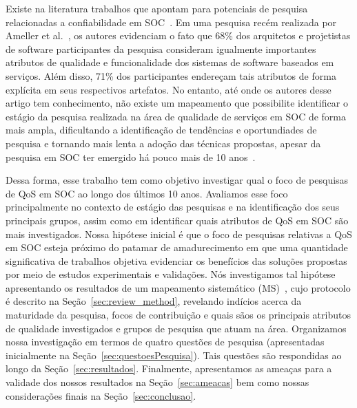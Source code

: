 Existe na literatura trabalhos que apontam para potenciais de pesquisa relacionadas a confiabilidade em SOC~\cite{4797931}. Em uma pesquisa rec\'{e}m realizada por Ameller et al.~\cite{Ameller2013-ECSA}, os autores evidenciam o fato que 68\% dos arquitetos e projetistas de software participantes da pesquisa consideram igualmente importantes atributos de qualidade e funcionalidade dos sistemas de software baseados em servi\c{c}os. Al\'{e}m disso, 71\% dos participantes endere\c{c}am tais atributos de forma expl\'{i}cita em seus respectivos artefatos. No entanto, at\'{e} onde os autores desse artigo tem conhecimento, n\~{a}o existe um mapeamento que possibilite identificar o est\'{a}gio da pesquisa realizada na \'{a}rea de qualidade de servi\c cos em SOC de forma mais ampla, dificultando a identifica\c c\~{a}o de tend\^{e}ncias e oportundiades de pesquisa e tornando mais lenta a ado\c c\~{a}o das t\'{e}cnicas propostas, apesar da pesquisa em SOC ter emergido h\'{a} pouco mais de 10 anos~\cite{papazoglou:cacm2003}.

Dessa forma, esse trabalho tem como objetivo investigar qual o foco de pesquisas de QoS em SOC ao longo dos \'{u}ltimos 10 anos. Avaliamos esse foco principalmente no contexto de est\'{a}gio das pesquisas e na identifica\c{c}\~{a}o dos seus principais grupos, assim como em identificar quais atributos de QoS em SOC s\~{a}o mais investigados. Nossa hip\'{o}tese inicial \'{e} que o foco de pesquisas relativas a QoS em SOC esteja próximo do patamar de amadurecimento em que uma quantidade significativa de trabalhos objetiva evidenciar os benef\'{i}cios das solu\c c\~{o}es propostas por meio de estudos experimentais e valida\c c\~{o}es. N\'{o}s investigamos tal hip\'{o}tese apresentando os resultados de um mapeamento sistem\'{a}tico (MS)~\cite{petersen:sms2008}, cujo protocolo \'{e} descrito na Seção~\ref{sec:review_method}, revelando indícios acerca da maturidade da pesquisa, focos de contribuição e quais s\~{a}os os principais atributos de qualidade investigados e grupos de pesquisa que atuam na \'{a}rea. 
Organizamos nossa investiga\c{c}\~{a}o em termos de quatro quest\~{o}es de pesquisa (apresentadas inicialmente na Seção~\ref{sec:questoesPesquisa}). Tais questões são respondidas ao longo da Se\c c\~{a}o~\ref{sec:resultados}. Finalmente, apresentamos as amea\c cas para 
a validade dos nossos resultados na Se\c c\~{a}o~\ref{sec:ameacas} bem como nossas considera\c c\~{o}es finais na Se\c c\~{a}o~\ref{sec:conclusao}. 

 


